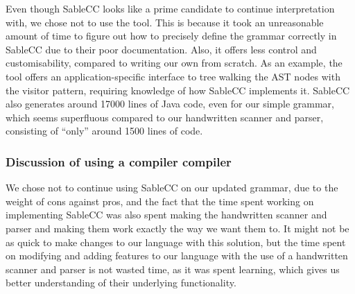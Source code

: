 Even though SableCC looks like a prime candidate to continue
interpretation with, we chose not to use the tool. This is because it
took an unreasonable amount of time to figure out how to precisely
define the grammar correctly in SableCC due to their poor
documentation. Also, it offers less control and
customisability, compared to writing our own from scratch. As an
example, the tool offers an application-specific interface to tree
walking the AST nodes with the visitor pattern, requiring knowledge of
how SableCC implements it. SableCC also generates around \num{17000} lines
of Java code, even for our simple grammar, which seems superfluous
compared to our handwritten scanner and parser, consisting of ``only''
around \num{1500} lines of code.

\subsubsection{Discussion of using a compiler compiler}
We chose not to continue using SableCC on our updated grammar, due
to the weight of cons against pros, and the fact that the time spent
working on implementing SableCC was also spent making the handwritten
scanner and parser and making them work exactly the way we want them to.
It might not be as quick to make changes to our language with this solution, but
the time spent on modifying and adding features to our language with the
use of a handwritten scanner and parser is not wasted time, as it was
spent learning, which gives us better understanding of their underlying
functionality.
